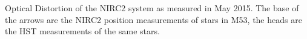 Optical Distortion of the NIRC2 system as measured in May 2015.  The base of the arrows are the NIRC2 position measurements of stars in M53, the heads are the HST measurements of the same stars. \label{quiver_apr} 